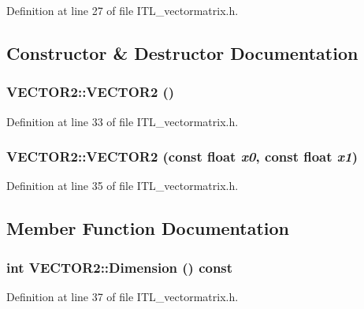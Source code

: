 Definition at line 27 of file ITL\_\-vectormatrix.h.



\subsection{Constructor \& Destructor Documentation}
\hypertarget{classVECTOR2_a321837bdc28f77b6958cb2bccb41fc92}{
\subsubsection[{VECTOR2}]{\setlength{\rightskip}{0pt plus 5cm}VECTOR2::VECTOR2 ()}}
\label{classVECTOR2_a321837bdc28f77b6958cb2bccb41fc92}


Definition at line 33 of file ITL\_\-vectormatrix.h.

\hypertarget{classVECTOR2_a7ad80af0b479f2c9fc1cbe8c3c912e13}{
\subsubsection[{VECTOR2}]{\setlength{\rightskip}{0pt plus 5cm}VECTOR2::VECTOR2 (const float {\em x0}, \/  const float {\em x1})}}
\label{classVECTOR2_a7ad80af0b479f2c9fc1cbe8c3c912e13}


Definition at line 35 of file ITL\_\-vectormatrix.h.



\subsection{Member Function Documentation}
\hypertarget{classVECTOR2_a6c5930e1fbcbbb6b9fea0db80b83a515}{
\subsubsection[{Dimension}]{\setlength{\rightskip}{0pt plus 5cm}int VECTOR2::Dimension () const}}
\label{classVECTOR2_a6c5930e1fbcbbb6b9fea0db80b83a515}


Definition at line 37 of file ITL\_\-vectormatrix.h.

